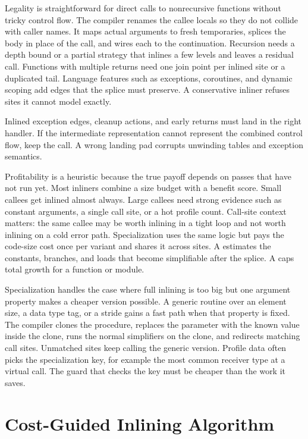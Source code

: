 Legality is straightforward for direct calls to nonrecursive functions without tricky control flow.
The compiler renames the callee locals so they do not collide with caller names.
It maps actual arguments to fresh temporaries, splices the body in place of the call, and wires each  to the continuation.
Recursion needs a depth bound or a partial strategy that inlines a few levels and leaves a residual call.
Functions with multiple returns need one join point per inlined site or a duplicated tail.
Language features such as exceptions, coroutines, and dynamic scoping add edges that the splice must preserve.
A conservative inliner refuses sites it cannot model exactly.
\begin{ccwarning}
Inlined exception edges, cleanup actions, and early returns must land in the right handler.
If the intermediate representation cannot represent the combined control flow, keep the call.
A wrong landing pad corrupts unwinding tables and exception semantics.
\end{ccwarning}

Profitability is a heuristic because the true payoff depends on passes that have not run yet.
Most inliners combine a size budget with a benefit score.
Small callees get inlined almost always.
Large callees need strong evidence such as constant arguments, a single call site, or a hot profile count.
Call-site context matters: the same callee may be worth inlining in a tight loop and not worth inlining on a cold error path.
Specialization uses the same logic but pays the code-size cost once per variant and shares it across sites.
A  estimates the constants, branches, and loads that become simplifiable after the splice.
A  caps total growth for a function or module.

Specialization handles the case where full inlining is too big but one argument property makes a cheaper version possible.
A generic routine over an element size, a data type tag, or a stride gains a fast path when that property is fixed.
The compiler clones the procedure, replaces the parameter with the known value inside the clone, runs the normal simplifiers on the clone, and redirects matching call sites.
Unmatched sites keep calling the generic version.
Profile data often picks the specialization key, for example the most common receiver type at a virtual call.
The guard that checks the key must be cheaper than the work it saves.

\section{Cost-Guided Inlining Algorithm}\label{sec:ch23-algorithm}


